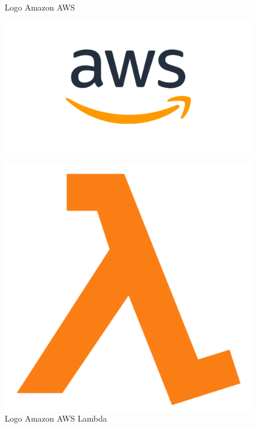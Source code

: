 \documentclass[
    12pt,
    openright,
    twoside,
    a4paper,
    english,
    spanish,
    brazil,
    ]{abntex2}
\begin{document}
\begin{figure}[htb]
	\label{fig_logo_aws}
	\centering
	\begin{minipage}{0.4\textwidth}
		\centering
		\caption{Logo Amazon AWS} \label{fig_logo_aws}
		\includegraphics[scale=0.2]{Images/logo_aws.pdf}
	\end{minipage}
	\hfill
	\begin{minipage}{0.4\textwidth}
		\centering
		\caption{Logo Amazon AWS Lambda} \label{fig_logo_aws_lambda}
		\includegraphics[scale=0.1]{Images/logo_aws_lambda.pdf}
	\end{minipage}
	\hfill
	\begin{minipage}{0.4\textwidth}

\end{minipage}
\end{figure}
\end{document}
